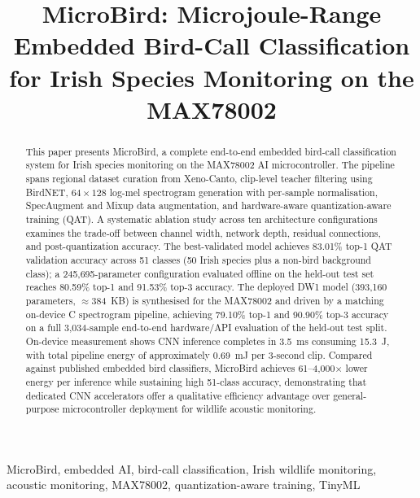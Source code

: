 \documentclass[conference]{IEEEtran}
\begin{document}
\title{MicroBird: Microjoule-Range Embedded Bird-Call Classification\\for Irish Species Monitoring on the MAX78002}

\author{
}

\maketitle

\begin{abstract}
This paper presents MicroBird, a complete end-to-end embedded bird-call classification system for Irish species monitoring on the MAX78002 AI microcontroller. The pipeline spans regional dataset curation from Xeno-Canto, clip-level teacher filtering using BirdNET, $64{\times}128$ log-mel spectrogram generation with per-sample normalisation, SpecAugment and Mixup data augmentation, and hardware-aware quantization-aware training (QAT). A systematic ablation study across ten architecture configurations examines the trade-off between channel width, network depth, residual connections, and post-quantization accuracy. The best-validated model achieves 83.01\% top-1 QAT validation accuracy across 51 classes (50 Irish species plus a non-bird background class); a 245,695-parameter configuration evaluated offline on the held-out test set reaches 80.59\% top-1 and 91.53\% top-3 accuracy. The deployed DW1 model (393,160 parameters, $\approx$384~KB) is synthesised for the MAX78002 and driven by a matching on-device C spectrogram pipeline, achieving 79.10\% top-1 and 90.90\% top-3 accuracy on a full 3{,}034-sample end-to-end hardware/API evaluation of the held-out test split. On-device measurement shows CNN inference completes in 3.5~ms consuming 15.3~\textmu J, with total pipeline energy of approximately 0.69~mJ per 3-second clip. Compared against published embedded bird classifiers, MicroBird achieves 61--4{,}000$\times$ lower energy per inference while sustaining high 51-class accuracy, demonstrating that dedicated CNN accelerators offer a qualitative efficiency advantage over general-purpose microcontroller deployment for wildlife acoustic monitoring.
\end{abstract}

\begin{IEEEkeywords}
MicroBird, embedded AI, bird-call classification, Irish wildlife monitoring, acoustic monitoring, MAX78002, quantization-aware training, TinyML
\end{IEEEkeywords}
\end{document}
